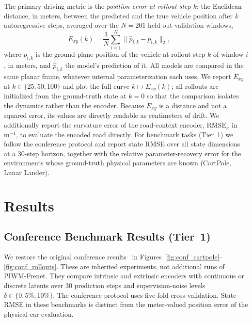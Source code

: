 \documentclass[preprint,12pt]{elsarticle}
\begin{document}
The primary driving metric is the \emph{position error at rollout step $k$}: the
Euclidean distance, in meters, between the predicted and the true vehicle
position after $k$ autoregressive steps, averaged over the $N = 201$ held-out
validation windows,
\begin{equation}
    E_{xy}(k) = \frac{1}{N}\sum_{i=1}^{N}
    \bigl\lVert \hat{p}_{i,k} - p_{i,k} \bigr\rVert_2 ,
    \qquad
    \label{eq:metric_exy}
\end{equation}
where $p_{i,k}$ is the ground-plane position of the vehicle at rollout step $k$ of
window $i$, in meters, and $\hat{p}_{i,k}$ the model's prediction of it. All models
are compared in the same planar frame, whatever internal parameterization each
uses.
We report $E_{xy}$ at $k \in \{25, 50, 100\}$ and plot the full curve
$k \mapsto E_{xy}(k)$; all rollouts are initialized from the ground-truth state at
$k=0$ so that the comparison isolates the dynamics rather than the encoder.
Because $E_{xy}$ is a distance and not a squared error, its values are directly
readable as centimeters of drift.
We additionally report the curvature error of the road-context encoder,
$\mathrm{RMSE}_\kappa$ in $\mathrm{m}^{-1}$, to evaluate the encoded road
directly.
For benchmark tasks (Tier~1) we follow the conference protocol and report state
RMSE over all state dimensions at a 30-step horizon, together with the relative
parameter-recovery error for the environments whose ground-truth physical
parameters are known (CartPole, Lunar Lander).


\section{Results}\label{sec:results}

\subsection{Conference Benchmark Results (Tier~1)}\label{sec:conf_results}

We restore the original conference results~\cite{piwm_conf} in
Figures~\ref{fig:conf_cartpole}--\ref{fig:conf_rollouts}. These are inherited
experiments, not additional runs of PIWM-Frenet. They compare intrinsic and
extrinsic encoders with continuous or discrete latents over 30 prediction steps
and supervision-noise levels $\delta\in\{0,5\%,10\%\}$. The conference protocol
uses five-fold cross-validation. State RMSE in these benchmarks is distinct from
the meter-valued position error of the physical-car evaluation.
\end{document}

